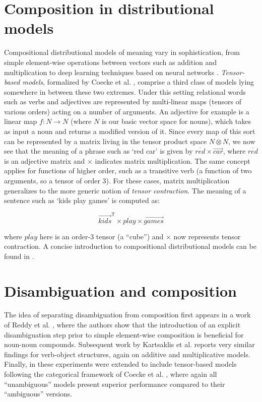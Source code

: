 \documentclass[11pt]{article}
\newcommand{\ov}{\overrightarrow}
\begin{document}
\section{Composition in distributional models}
\label{sec:comp}

Compositional distributional models of meaning vary in sophistication, from simple element-wise operations between vectors such as addition and multiplication \cite{Lapata} to deep learning techniques based on neural networks \cite{socher2011,socher2012,nal13cvs}. \textit{Tensor-based models}, formalized by Coecke et al. , comprise a third class of models lying somewhere in between these two extremes. Under this setting relational words such as verbs and adjectives are represented by multi-linear maps (tensors of various orders) acting on a number of arguments. An adjective for example is a linear map $f: N \to N$ (where $N$ is our basic vector space for nouns), which takes as input a noun and returns a modified version of it. Since every map of this sort can be represented by a matrix living in the tensor product space $N \otimes N$, we now see that the meaning of a phrase such as `red car' is given by $\overline{red} \times \ov{car}$, where $\overline{red}$ is an adjective matrix and $\times$ indicates matrix multiplication. The same concept applies for functions of higher order, such as a transitive verb (a function of two arguments, so a tensor of order 3). For these cases, matrix multiplication generalizes to the more generic notion of \textit{tensor contraction}. The meaning of a sentence such as `kids play games' is computed as:

\vspace{-0.2cm}
\begin{equation}
   \ov{kids}^\mathsf{T} \times \overline{play} \times \ov{games}
   \label{equ:tensor}
\end{equation}

\noindent where $\overline{play}$ here is an order-3 tensor (a ``cube'') and $\times$ now represents tensor contraction. A concise introduction to compositional distributional models can be found in \cite{KartsaklisSpringer}. 

\section{Disambiguation and composition}
\label{sec:prev}

The idea of separating disambiguation from composition first appears in a work of Reddy et al. , where the authors show that the introduction of an explicit disambiguation step prior to simple element-wise composition is beneficial for noun-noun compounds. Subsequent work by Kartsaklis et al.  reports very similar findings for verb-object structures, again on additive and multiplicative models. Finally, in \cite{KartsaklisEMNLP} these experiments were extended to include tensor-based models following the categorical framework of Coecke et al. , where again all ``unambiguous'' models present superior performance compared to their ``ambiguous'' versions. 
\end{document}
